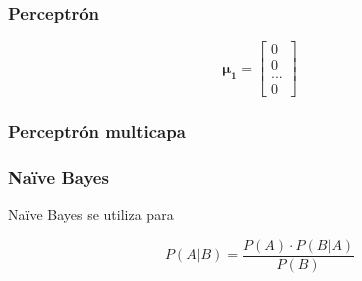 \subsubsection*{}

\begin{figure}[H]
	\centering
	
	\label{fig:svm}
\end{figure}

\subsubsection*{Perceptrón}

\begin{figure}[H]
	\centering
	
	\label{fig:perceptron}
\end{figure}

\begin{equation}
 \pmb{\mu_1} = \begin{bmatrix}0\\0\\...\\0\end{bmatrix}
\end{equation}

\subsubsection*{Perceptrón multicapa}

\begin{figure}[H]
	\centering
	
	\label{fig:multilayer-perceptron}
\end{figure}

\subsubsection*{Na\"ive Bayes}

Na\"ive Bayes se utiliza para

\begin{equation}
 P(A|B) = \frac{P(A) \cdot P(B|A)}{P(B)}
 \label{eq:naive-bayes}
\end{equation}


